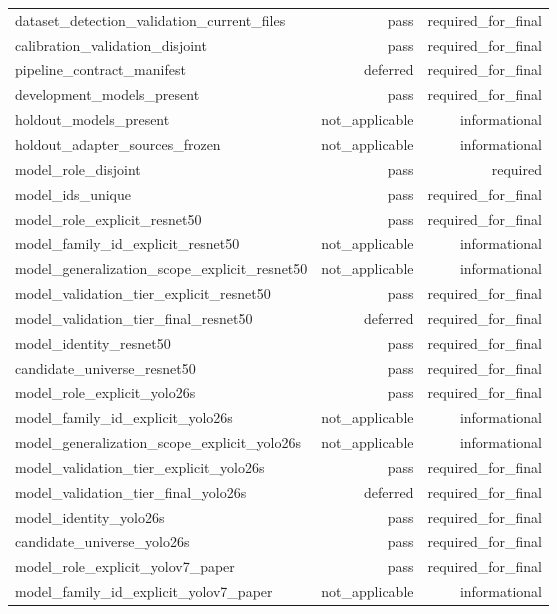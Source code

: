 \begin{table}[t]
\begin{tabular}{lrr}
dataset\_detection\_validation\_current\_files & pass & required\_for\_final \\
calibration\_validation\_disjoint & pass & required\_for\_final \\
pipeline\_contract\_manifest & deferred & required\_for\_final \\
development\_models\_present & pass & required\_for\_final \\
holdout\_models\_present & not\_applicable & informational \\
holdout\_adapter\_sources\_frozen & not\_applicable & informational \\
model\_role\_disjoint & pass & required \\
model\_ids\_unique & pass & required\_for\_final \\
model\_role\_explicit\_resnet50 & pass & required\_for\_final \\
model\_family\_id\_explicit\_resnet50 & not\_applicable & informational \\
model\_generalization\_scope\_explicit\_resnet50 & not\_applicable & informational \\
model\_validation\_tier\_explicit\_resnet50 & pass & required\_for\_final \\
model\_validation\_tier\_final\_resnet50 & deferred & required\_for\_final \\
model\_identity\_resnet50 & pass & required\_for\_final \\
candidate\_universe\_resnet50 & pass & required\_for\_final \\
model\_role\_explicit\_yolo26s & pass & required\_for\_final \\
model\_family\_id\_explicit\_yolo26s & not\_applicable & informational \\
model\_generalization\_scope\_explicit\_yolo26s & not\_applicable & informational \\
model\_validation\_tier\_explicit\_yolo26s & pass & required\_for\_final \\
model\_validation\_tier\_final\_yolo26s & deferred & required\_for\_final \\
model\_identity\_yolo26s & pass & required\_for\_final \\
candidate\_universe\_yolo26s & pass & required\_for\_final \\
model\_role\_explicit\_yolov7\_paper & pass & required\_for\_final \\
model\_family\_id\_explicit\_yolov7\_paper & not\_applicable & informational \\

\end{tabular}
\end{table}
